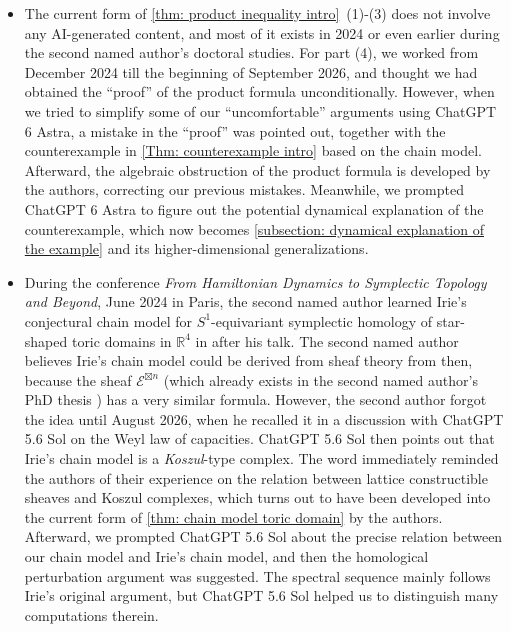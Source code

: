 \documentclass[11pt]{amsart}
\numberwithin{equation}{section}
\theoremstyle{plain}
\theoremstyle{definition}
\theoremstyle{remark}
\newcommand{\bR} { {\mathbb{R}}}
\newcommand{\cE} { {\mathcal{E}}}
\begin{document}
\begin{itemize}[fullwidth]
    \item The current form of \autoref{thm: product inequality intro}~(1)-(3) does not involve any AI-generated content, and most of it exists in 2024 or even earlier during the second named author's doctoral studies. For part (4), we worked from December 2024 till the beginning of September 2026, and thought we had obtained the ``proof'' of the product formula unconditionally. However, when we tried to simplify some of our ``uncomfortable'' arguments using ChatGPT 6 Astra, a mistake in the ``proof'' was pointed out, together with the counterexample in \autoref{Thm: counterexample intro} based on the chain model. Afterward, the algebraic obstruction of the product formula is developed by the authors, correcting our previous mistakes. Meanwhile, we prompted ChatGPT 6 Astra to figure out the potential dynamical explanation of the counterexample, which now becomes \autoref{subsection: dynamical explanation of the example} and its higher-dimensional generalizations.

    \item During the conference \textit{From Hamiltonian Dynamics to Symplectic Topology and Beyond}, June 2024 in Paris, the second named author learned Irie's conjectural chain model for $S^1$-equivariant symplectic homology of star-shaped toric domains in $\bR^4$ in \cite{Irie_ChainModel} after his talk. The second named author believes Irie's chain model could be derived from sheaf theory from then, because the sheaf $\cE^{\boxtimes n}$ (which already exists in the second named author's PhD thesis \cite{zhangthesis}) has a very similar formula. However, the second author forgot the idea until August 2026, when he recalled it in a discussion with ChatGPT 5.6 Sol on the Weyl law of capacities. ChatGPT 5.6 Sol then points out that  Irie's chain model is a \textit {Koszul}-type complex. The word immediately reminded the authors of their experience on the relation between lattice constructible sheaves and Koszul complexes, which turns out to have been developed into the current form of \autoref{thm: chain model toric domain} by the authors. Afterward, we prompted ChatGPT 5.6 Sol about the precise relation between our chain model and Irie's chain model, and then the homological perturbation argument was suggested. The spectral sequence mainly follows Irie's original argument, but ChatGPT 5.6 Sol helped us to distinguish many computations therein.


\end{itemize}
\end{document}
